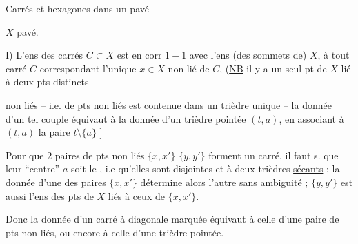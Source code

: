 
Carrés et hexagones dans un pavé

$X$ pavé.

I) L'ens des carrés $C\subset X$ est en corr $1-1$ avec l'ens (des sommets de) $X$, à tout carré $C$ correspondant l'unique $x\in X$ non lié   de $C$,  (\uline{NB} il y a un seul pt de $X$  lié à  deux pts distincts


non liés -- i.e.    de pts  non liés est contenue dans un trièdre unique -- la donnée d'un tel couple équivaut  à la donnée d'un trièdre pointée $(t,a)$, en associant à $(t,a)$ la paire $t\setminus\{a\}$ ]

Pour que $2$ paires de pts non liés $\{x,x'\}$ $\{y,y'\}$ forment un carré, il faut s. que  leur ``centre'' $a$ soit le , i.e qu'elles sont disjointes et  à deux trièdres \uline{sécants} ; la donnée d'une  des paires $\{x,x'\}$ détermine alors l'autre sans ambiguité ; $\{y,y'\}$ est aussi l'ens des pts de $X$ liés à ceux de $\{x,x'\}$.



Donc la donnée d'un carré à diagonale marquée équivaut à celle d'une paire de pts non liés, ou encore à celle d'une trièdre pointée.


